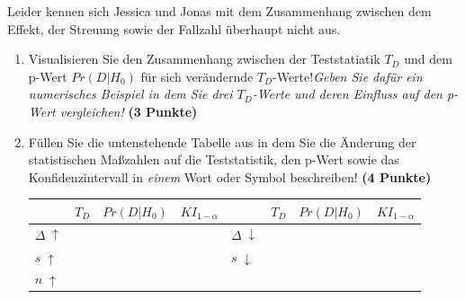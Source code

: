 \documentclass[a4paper, 9pt]{scrartcl}\usepackage[]{graphicx}\usepackage[]{xcolor}
\begin{document}
\vspace{1ex}

Leider kennen sich Jessica und Jonas mit dem Zusammenhang zwischen dem Effekt, der Streuung sowie der Fallzahl überhaupt nicht aus. 


\begin{enumerate}
\item Visualisieren Sie den Zusammenhang zwischen der Teststatiatik $T_{D}$ und dem p-Wert $Pr(D|H_0)$ für sich verändernde $T_{D}$-Werte!\textit{Geben Sie dafür ein numerisches Beispiel in dem Sie drei $T_{D}$-Werte und deren Einfluss auf den p-Wert vergleichen!} \textbf{(3 Punkte)}  
\item  Füllen Sie die untenstehende Tabelle aus in dem Sie die Änderung der statistischen Maßzahlen auf die Teststatistik, den p-Wert sowie das Konfidenzintervall in \textit{einem} Wort oder Symbol beschreiben! \textbf{(4 Punkte)}
\begin{center}
  \large
  \begin{tabular}[c]{l|c|c|c|l|c|c|c}
    & $T_{D}$ & $Pr(D|H_0)$ & $KI_{1-\alpha}$ & & $T_{D}$ & $Pr(D|H_0)$ & $KI_{1-\alpha}$\strut\\ 
    \hline
    \textbf{$\Delta\; \uparrow$} & \hspace{1.8cm} & \hspace{1.8cm}  & \hspace{1.8cm} & \textbf{
                                                          $\Delta\; \downarrow$} &
                                                                          \hspace{1.8cm} & \hspace{1.8cm}  & \hspace{1.8cm}\strut\\
    \hline
        \textbf{$s\; \uparrow$} & \hspace{1.8cm} & \hspace{1.8cm}  & \hspace{1.8cm} & \textbf{
                                                          $s\; \downarrow$} &
                                                                          \hspace{1.8cm}
                                                & \hspace{1.8cm}  & \hspace{1.8cm}\strut\\
    \hline
        \textbf{$n\; \uparrow$} & \hspace{1.8cm} & \hspace{1.8cm}  & \hspace{1.8cm} & \textbf{
}
\end{tabular}
\end{center}
\end{enumerate}
\end{document}
